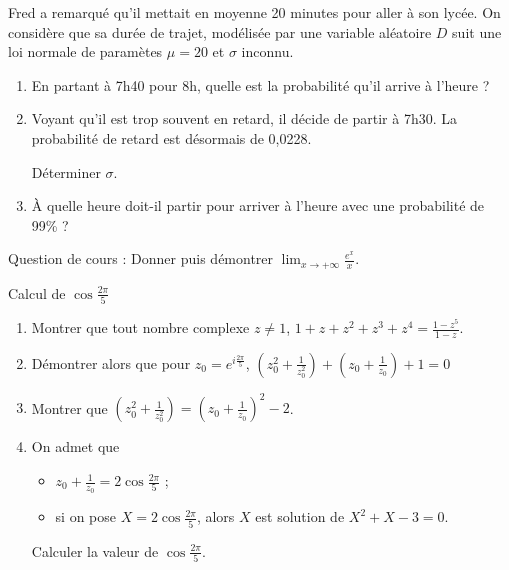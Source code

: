 \begin{question}[topic=loi_continue]
  Fred a remarqué qu'il mettait en moyenne 20 minutes pour aller à son
  lycée. On considère que sa durée de trajet, modélisée par une variable
  aléatoire $D$ suit une loi normale de paramètes $\mu = 20$ et $\sigma$
  inconnu.

  \begin{enumerate}
    \item En partant à 7h40 pour 8h, quelle est la probabilité qu'il
      arrive à l'heure ?
    \item Voyant qu'il est trop souvent en retard, il décide de partir à
      7h30. La probabilité de retard est désormais de 0,0228.

      Déterminer $\sigma$.
    \item À quelle heure doit-il partir pour arriver à l'heure avec une
      probabilité de 99\% ?
  \end{enumerate}
\end{question}

\begin{question}[topic=exponentielle]
  Question de cours : Donner puis démontrer
  $\lim_{x\to+\infty}\frac{e^x}x$.
\end{question}

\begin{question}[topic=cos:complexes]
  Calcul de $\cos\frac{2\pi}{5}$

  \begin{enumerate}
    \item Montrer que tout nombre complexe $z\neq 1$, $1 + z + z^2 + z^3 +
      z^4 = \frac{1 - z^5}{1 - z}$.
    \item Démontrer alors que pour $z_0 = e^{i\frac{2\pi}5}$, $\left(z_0^2
      + \frac1{z_0^2} \right) + \left(z_0 + \frac1{z_0}\right) + 1 = 0$
    \item Montrer que $\left(z_0^2 + \frac1{z_0^2} \right) = \left(z_0 +
      \frac1{z_0}\right)^2 - 2$.
    \item On admet que
      \begin{itemize}
        \item $z_0 + \frac1{z_0} = 2\cos\frac{2\pi}5$ ;
        \item si on pose $X = 2\cos\frac{2\pi}5$, alors $X$ est solution
          de $X^2 + X - 3 = 0$.
      \end{itemize}
      Calculer la valeur de $\cos\frac{2\pi}5$.
  \end{enumerate}
\end{question}

